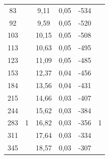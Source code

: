\documentclass[a4paper,12pt]{report}
\begin{document}
\begin{table}[H]
\begin{tabular}{|c|c|c|c|c|c|}
83                            &                                       & 9,11                              & 0,05                              & -534                         &                                      \\ \cline{1-1} \cline{3-5}
92                            &                                       & 9,59                              & 0,05                              & -520                         &                                      \\ \cline{1-1} \cline{3-5}
103                           &                                       & 10,15                             & 0,05                              & -508                         &                                      \\ \cline{1-1} \cline{3-5}
113                           &                                       & 10,63                             & 0,05                              & -495                         &                                      \\ \cline{1-1} \cline{3-5}
123                           &                                       & 11,09                             & 0,05                              & -485                         &                                      \\ \cline{1-1} \cline{3-5}
153                           &                                       & 12,37                             & 0,04                              & -456                         &                                      \\ \cline{1-1} \cline{3-5}
184                           &                                       & 13,56                             & 0,04                              & -431                         &                                      \\ \hline
215 & \multirow{15}{*}{1} & 14,66 & 0,03 & -407 & \multirow{15}{*}{1} \\ \cline{1-1} \cline{3-5}
244 &                     & 15,62 & 0,03 & -384 &                     \\ \cline{1-1} \cline{3-5}
283 &                     & 16,82 & 0,03 & -356 &                     \\ \cline{1-1} \cline{3-5}
311 &                     & 17,64 & 0,03 & -334 &                     \\ \cline{1-1} \cline{3-5}
345 &                     & 18,57 & 0,03 & -307 &                     \\ \cline{1-1} \cline{3-5}

\end{tabular}
\end{table}
\end{document}
